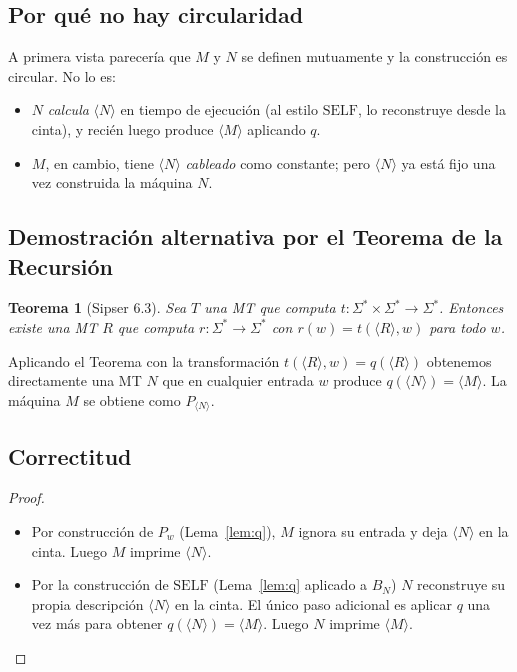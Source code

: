 \documentclass[11pt,a4paper]{article}
\theoremstyle{plain}
\newtheorem{teorema}{Teorema}[section]
\theoremstyle{definition}
\theoremstyle{remark}
\newcommand{\enc}[1]{\langle #1\rangle}
\newcommand{\Sstar}{\Sigma^{*}}
\newcommand{\SELF}{\mathrm{SELF}}
\newcommand{\Pw}[1]{P_{#1}}
\begin{document}
\subsection*{Por qu\'e no hay circularidad}

A primera vista parecer\'ia que $M$ y $N$ se definen mutuamente y la
construcci\'on es circular. No lo es:
\begin{itemize}
  \item $N$ \emph{calcula} $\enc{N}$ en tiempo de ejecuci\'on (al estilo
        $\SELF$, lo reconstruye desde la cinta), y reci\'en luego produce
        $\enc{M}$ aplicando $q$.
  \item $M$, en cambio, tiene $\enc{N}$ \emph{cableado} como constante; pero
        $\enc{N}$ ya est\'a fijo una vez construida la m\'aquina $N$.
\end{itemize}

\subsection*{Demostraci\'on alternativa por el Teorema de la Recursi\'on}

\begin{teorema}[Sipser 6.3]
Sea $T$ una MT que computa $t:\Sstar\times\Sstar\to\Sstar$. Entonces existe
una MT $R$ que computa $r:\Sstar\to\Sstar$ con
$r(w)=t(\enc{R},w)$ para todo $w$.
\end{teorema}

Aplicando el Teorema con la transformaci\'on $t(\enc{R},w) = q(\enc{R})$
obtenemos directamente una MT $N$ que en cualquier entrada $w$ produce
$q(\enc{N}) = \enc{M}$. La m\'aquina $M$ se obtiene como $\Pw{\enc{N}}$.

\subsection*{Correctitud}

\begin{proof}
\begin{itemize}
  \item Por construcci\'on de $\Pw{w}$ (Lema~\ref{lem:q}), $M$ ignora su
        entrada y deja $\enc{N}$ en la cinta. Luego $M$ imprime $\enc{N}$.
  \item Por la construcci\'on de $\SELF$ (Lema~\ref{lem:q} aplicado a $B_N$)
        $N$ reconstruye su propia descripci\'on $\enc{N}$ en la cinta.
        El \'unico paso adicional es aplicar $q$ una vez m\'as para obtener
        $q(\enc{N})=\enc{M}$. Luego $N$ imprime $\enc{M}$.
\end{itemize}
\end{proof}
\end{document}

